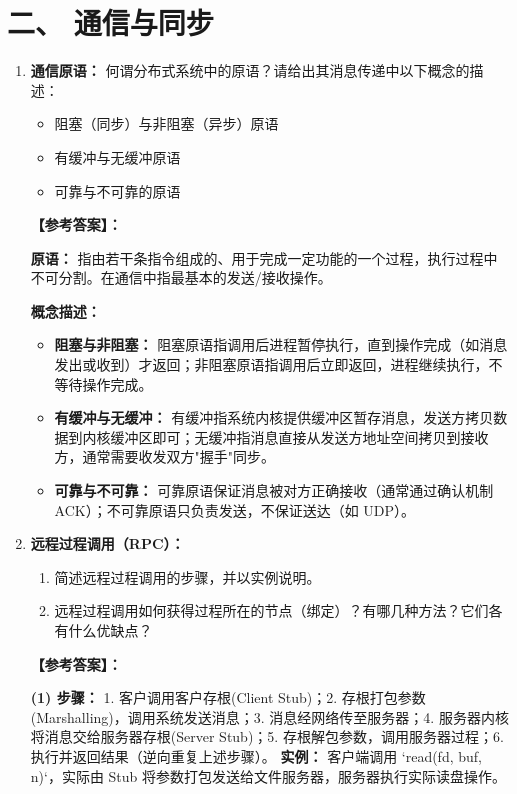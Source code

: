 \documentclass[a4paper,12pt]{article}
\newcommand{\answer}[1]{\par\vspace{0.5em}\hspace{2em}\textbf{【参考答案】：}\\{\color{blue}#1}\par\vspace{1em}}
\begin{document}
\section{二、 通信与同步}

\begin{enumerate}[label=\arabic*.]
    \item \textbf{通信原语：}
    何谓分布式系统中的原语？请给出其消息传递中以下概念的描述：
    \begin{itemize}
        \item 阻塞（同步）与非阻塞（异步）原语
        \item 有缓冲与无缓冲原语
        \item 可靠与不可靠的原语
    \end{itemize}

    \answer{
    \textbf{原语：} 指由若干条指令组成的、用于完成一定功能的一个过程，执行过程中不可分割。在通信中指最基本的发送/接收操作。
    
    \textbf{概念描述：}
    \begin{itemize}
        \item \textbf{阻塞与非阻塞：} 阻塞原语指调用后进程暂停执行，直到操作完成（如消息发出或收到）才返回；非阻塞原语指调用后立即返回，进程继续执行，不等待操作完成。
        \item \textbf{有缓冲与无缓冲：} 有缓冲指系统内核提供缓冲区暂存消息，发送方拷贝数据到内核缓冲区即可；无缓冲指消息直接从发送方地址空间拷贝到接收方，通常需要收发双方"握手"同步。
        \item \textbf{可靠与不可靠：} 可靠原语保证消息被对方正确接收（通常通过确认机制 ACK）；不可靠原语只负责发送，不保证送达（如 UDP）。
    \end{itemize}
    }

    \item \textbf{远程过程调用（RPC）：}
    \begin{enumerate}
        \item 简述远程过程调用的步骤，并以实例说明。
        \item 远程过程调用如何获得过程所在的节点（绑定）？有哪几种方法？它们各有什么优缺点？
    \end{enumerate}

    \answer{
    \textbf{(1) 步骤：}
    1. 客户调用客户存根(Client Stub)；2. 存根打包参数(Marshalling)，调用系统发送消息；3. 消息经网络传至服务器；4. 服务器内核将消息交给服务器存根(Server Stub)；5. 存根解包参数，调用服务器过程；6. 执行并返回结果（逆向重复上述步骤）。
    \textbf{实例：} 客户端调用 `read(fd, buf, n)`，实际由 Stub 将参数打包发送给文件服务器，服务器执行实际读盘操作。

}
\end{enumerate}
\end{document}
